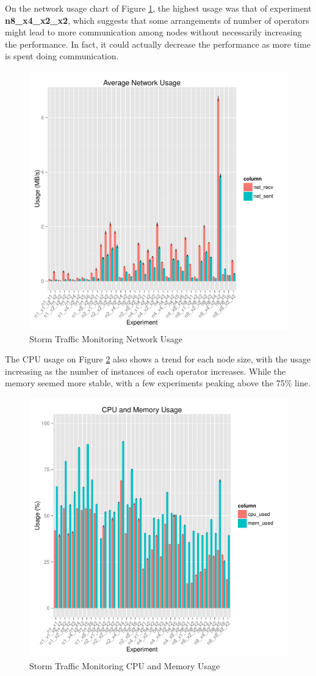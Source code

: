 \documentclass[ppgc,diss,english]{iiufrgs}
\begin{document}
On the network usage chart of Figure \ref{fig:storm_trafficmonitoring_network}, the highest usage was that of experiment \textbf{n8\_x4\_x2\_x2}, which suggests that some arrangements of number of operators might lead to more communication among nodes without necessarily increasing the  performance. In fact, it could actually decrease the performance as more time is spent doing communication.

\begin{figure}[H]
    \centering
	\includegraphics[width=.6\textwidth]{summaries/storm_trafficmonitoring/full_network.pdf}
	\caption{Storm Traffic Monitoring Network Usage}
	\label{fig:storm_trafficmonitoring_network}
\end{figure}

The CPU usage on Figure \ref{fig:storm_trafficmonitoring_cpu_mem} also shows a trend for each node size, with the usage increasing as the number of instances of each operator increases. While the memory seemed more stable, with a few experiments peaking above the 75\% line.

\begin{figure}[H]
    \centering
	\includegraphics[width=.6\textwidth]{summaries/storm_trafficmonitoring/full_cpu_mem.pdf}
	\caption{Storm Traffic Monitoring CPU and Memory Usage}
	\label{fig:storm_trafficmonitoring_cpu_mem}
\end{figure}
\end{document}
